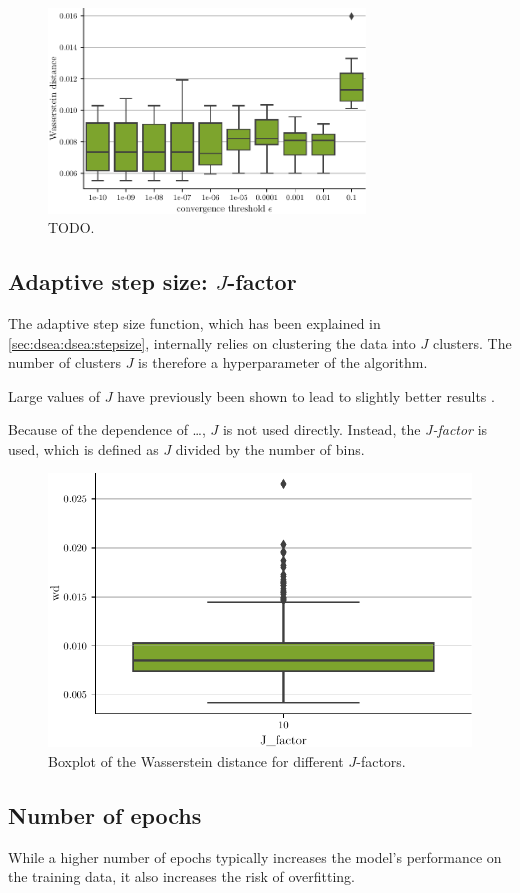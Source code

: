 \begin{figure}
  \centering
  \includegraphics[width=0.75\textwidth]{content/plots/hyperparam/epsilon_vs_wd_boxplot_full.pdf}
  \caption{TODO.}
  \label{fig:hyperparameter:epsilon}
\end{figure}


\subsection{Adaptive step size: $J$-factor}
The adaptive step size function,
  which has been explained in \autoref{sec:dsea:dsea:stepsize},
internally relies on clustering the data into $J$ clusters.
The number of clusters $J$ is therefore a hyperparameter of the algorithm.

Large values of $J$ have previously been shown to lead to slightly better results \cite{dsea_mirko}.

Because of the dependence of …,
$J$ is not used directly.
Instead, the \emph{J-factor} is used,
which is defined as $J$ divided by the number of bins.

\begin{figure}
  \centering
  \includegraphics[scale=1]{content/plots/hyperparam/J_factor_vs_wd_boxplot_full.pdf}
  \caption{Boxplot of the Wasserstein distance for different $J$-factors.}
  \label{fig:hyperparameter:J_factor}
\end{figure}

\subsection{Number of epochs}
While a higher number of epochs typically increases the model's performance on the training data,
it also increases the risk of overfitting.



